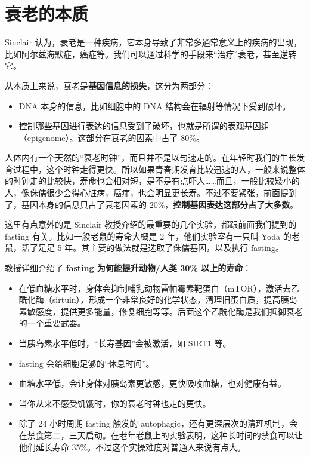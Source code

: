 \documentclass{report}
\begin{document}
\section{衰老的本质}

Sinclair 认为，衰老是一种疾病，它本身导致了非常多通常意义上的疾病的出现，比如阿尔兹海默症，癌症等。我们可以通过科学的手段来“治疗”衰老，甚至逆转它。

从本质上来说，衰老是\textbf{基因信息的损失}，这分为两部分：

\begin{itemize}
    \item DNA 本身的信息，比如细胞中的 DNA 结构会在辐射等情况下受到破坏。
    \item 控制哪些基因进行表达的信息受到了破坏，也就是所谓的表观基因组（epigenome）。这部分在衰老的因素中占了 80\%。
\end{itemize}

人体内有一个天然的“衰老时钟”，而且并不是以匀速走的。在年轻时我们的生长发育过程中，这个时钟走得更快。所以如果青春期发育比较迅速的人，一般来说整体的时钟走的比较快，寿命也会相对短，是不是有点吓人……而且，一般比较矮小的人，像侏儒很少会得心脏病，癌症，也会明显更长寿。不过不要紧张，前面提到了，基因本身的信息只占了衰老因素的 20\%，\textbf{控制基因表达这部分占了大多数}。

这里有点意外的是 Sinclair 教授介绍的最重要的几个实验，都跟前面我们提到的 fasting 有关。比如一般老鼠的寿命大概是 2 年，他们实验室有一只叫 Yoda 的老鼠，活了足足 5 年。其主要的做法就是选取了侏儒基因，以及执行 fasting。

教授详细介绍了 \textbf{fasting 为何能提升动物/人类 30\% 以上的寿命}：

\begin{itemize}
    \item 在低血糖水平时，身体会抑制哺乳动物雷帕霉素靶蛋白（mTOR），激活去乙酰化酶（sirtuin），形成一个非常良好的化学状态，清理旧蛋白质，提高胰岛素敏感度，提供更多能量，修复细胞等等。后面这个乙酰化酶是我们抵御衰老的一个重要武器。
    \item 当胰岛素水平低时，“长寿基因”会被激活，如 SIRT1 等。
    \item fasting 会给细胞足够的“休息时间”。
    \item 血糖水平低，会让身体对胰岛素更敏感，更快吸收血糖，也对健康有益。
    \item 当你从来不感受饥饿时，你的衰老时钟也走的更快。
    \item 除了 24 小时周期 fasting 触发的 autophagic，还有更深层次的清理机制，会在禁食第二，三天启动。在老年老鼠上的实验表明，这种长时间的禁食可以让他们延长寿命 35\%。不过这个实操难度对普通人来说有点大。
\end{itemize}
\end{document}

